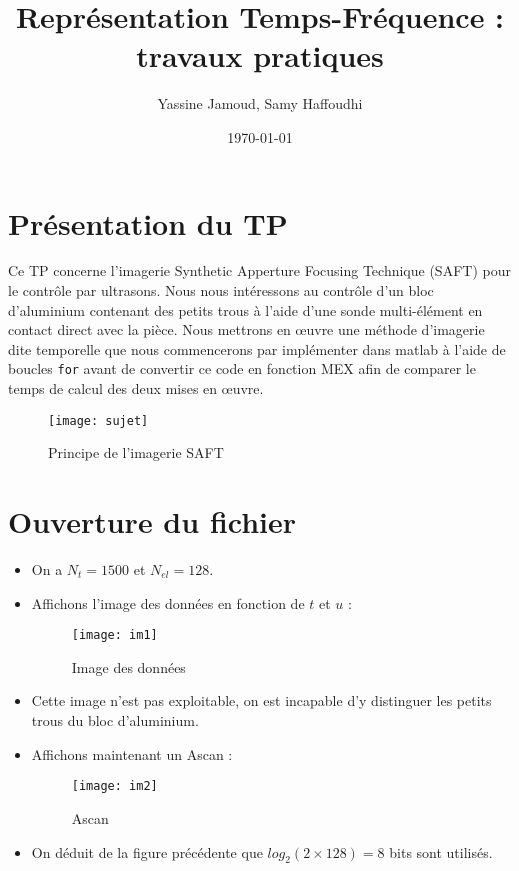 \documentclass[12pt,a4paper,titlepage]{article}
\title{Représentation  Temps-Fréquence : travaux pratiques}
\author{Yassine Jamoud, Samy Haffoudhi}
\date{\today}
\begin{document}
\maketitle

\section{Présentation du TP}

Ce TP concerne l'imagerie Synthetic Apperture Focusing Technique (SAFT) pour le
contrôle par ultrasons. Nous nous intéressons au contrôle d'un bloc d'aluminium
contenant des petits trous à l'aide d'une sonde multi-élément en contact direct
avec la pièce. Nous mettrons en œuvre une méthode d'imagerie dite temporelle que
nous commencerons par implémenter dans matlab à l'aide de boucles \texttt{for} avant
de convertir ce code en fonction MEX afin de comparer le temps de calcul des deux
mises en œuvre.

\begin{figure}[H]
    \caption{Principe de l'imagerie SAFT}
    \texttt{[image: sujet]}
    \centering
\end{figure}

\section{Ouverture du fichier}

\begin{itemize}
    \item{On a $N_t = 1500$ et $N_{el} = 128$.}
    \item{Affichons l'image des données en fonction de $t$ et $u$ :

            \begin{figure}[H]
                \caption{Image des données}
                \texttt{[image: im1]}
                \centering
            \end{figure}
        }
    \item{Cette image n'est pas exploitable, on est incapable d'y distinguer les
        petits trous du bloc d'aluminium.}
    \item{Affichons maintenant un Ascan :

            \begin{figure}[H]
                \caption{Ascan}
                \texttt{[image: im2]}
                \centering
            \end{figure}
        }
    \item{On déduit de la figure précédente que $log_2(2 \times 128) = 8$ bits sont utilisés.}
\end{itemize}
\end{document}
